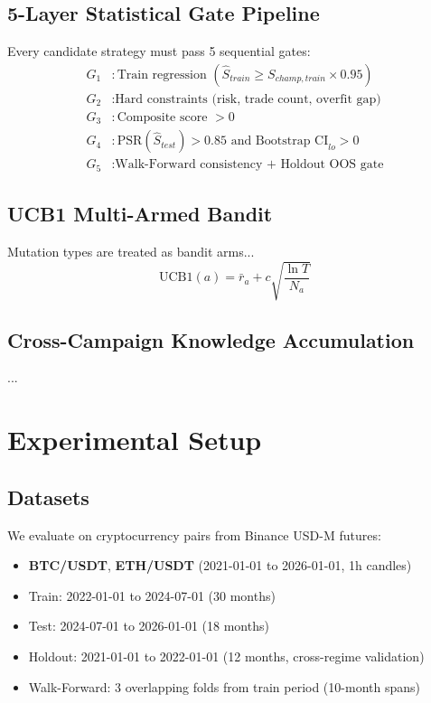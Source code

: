 \documentclass[11pt,a4paper]{article}
\begin{document}
\subsection{5-Layer Statistical Gate Pipeline}
Every candidate strategy must pass 5 sequential gates:
\begin{align}
  G_1&: \text{Train regression } (\hat{S}_{train} \geq S_{champ,train} \times 0.95) \\
  G_2&: \text{Hard constraints (risk, trade count, overfit gap)} \\
  G_3&: \text{Composite score } > 0 \\
  G_4&: \text{PSR}(\hat{S}_{test}) > 0.85 \text{ and Bootstrap CI}_{lo} > 0 \\
  G_5&: \text{Walk-Forward consistency + Holdout OOS gate}
\end{align}

\subsection{UCB1 Multi-Armed Bandit}
Mutation types are treated as bandit arms...
\begin{equation}
  \text{UCB1}(a) = \bar{r}_a + c \sqrt{\frac{\ln T}{N_a}}
\end{equation}

\subsection{Cross-Campaign Knowledge Accumulation}
...

\section{Experimental Setup}
\label{sec:experiments}

\subsection{Datasets}
We evaluate on cryptocurrency pairs from Binance USD-M futures:
\begin{itemize}
  \item \textbf{BTC/USDT}, \textbf{ETH/USDT} (2021-01-01 to 2026-01-01, 1h candles)
  \item Train: 2022-01-01 to 2024-07-01 (30 months)
  \item Test: 2024-07-01 to 2026-01-01 (18 months)
  \item Holdout: 2021-01-01 to 2022-01-01 (12 months, cross-regime validation)
  \item Walk-Forward: 3 overlapping folds from train period (10-month spans)
\end{itemize}
\end{document}

